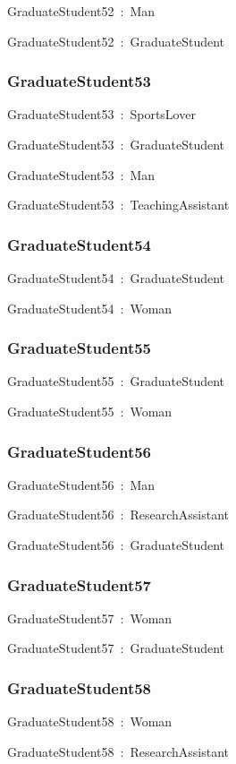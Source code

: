 \documentclass{article}
\begin{document}
GraduateStudent52~:~Man

GraduateStudent52~:~GraduateStudent

\subsubsection*{GraduateStudent53}

GraduateStudent53~:~SportsLover

GraduateStudent53~:~GraduateStudent

GraduateStudent53~:~Man

GraduateStudent53~:~TeachingAssistant

\subsubsection*{GraduateStudent54}

GraduateStudent54~:~GraduateStudent

GraduateStudent54~:~Woman

\subsubsection*{GraduateStudent55}

GraduateStudent55~:~GraduateStudent

GraduateStudent55~:~Woman

\subsubsection*{GraduateStudent56}

GraduateStudent56~:~Man

GraduateStudent56~:~ResearchAssistant

GraduateStudent56~:~GraduateStudent

\subsubsection*{GraduateStudent57}

GraduateStudent57~:~Woman

GraduateStudent57~:~GraduateStudent

\subsubsection*{GraduateStudent58}

GraduateStudent58~:~Woman

GraduateStudent58~:~ResearchAssistant
\end{document}
